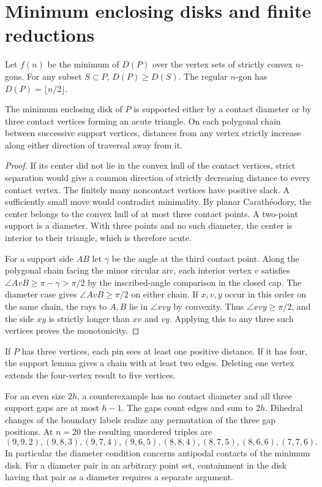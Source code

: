 \section{Minimum enclosing disks and finite reductions}

Let \(f(n)\) be the minimum of \(D(P)\) over the vertex sets of strictly convex \(n\)-gons. For any subset \(S\subset P\), \(D(P)\ge D(S)\). The regular \(n\)-gon has \(D(P)=\lfloor n/2\rfloor\).

\begin{lemma}
The minimum enclosing disk of \(P\) is supported either by a contact diameter or by three contact vertices forming an acute triangle. On each polygonal chain between successive support vertices, distances from any vertex strictly increase along either direction of traversal away from it.
\end{lemma}

\begin{proof}
If its center did not lie in the convex hull of the contact vertices, strict separation would give a common direction of strictly decreasing distance to every contact vertex. The finitely many noncontact vertices have positive slack. A sufficiently small move would contradict minimality. By planar Carath\'eodory, the center belongs to the convex hull of at most three contact points. A two-point support is a diameter. With three points and no such diameter, the center is interior to their triangle, which is therefore acute.

For a support side \(AB\) let \(\gamma\) be the angle at the third contact point. Along the polygonal chain facing the minor circular arc, each interior vertex \(v\) satisfies \(\angle AvB\ge\pi-\gamma>\pi/2\) by the inscribed-angle comparison in the closed cap. The diameter case gives \(\angle AvB\ge\pi/2\) on either chain. If \(x,v,y\) occur in this order on the same chain, the rays to \(A,B\) lie in \(\angle xvy\) by convexity. Thus \(\angle xvy\ge\pi/2\), and the side \(xy\) is strictly longer than \(xv\) and \(vy\). Applying this to any three such vertices proves the monotonicity.
\end{proof}

If \(P\) has three vertices, each pin sees at least one positive distance. If it has four, the support lemma gives a chain with at least two edges. Deleting one vertex extends the four-vertex result to five vertices.

For an even size \(2h\), a counterexample has no contact diameter and all three support gaps are at most \(h-1\). The gaps count edges and sum to \(2h\). Dihedral changes of the boundary labels realize any permutation of the three gap positions. At \(n=20\) the resulting unordered triples are
\[
 (9,9,2), (9,8,3), (9,7,4), (9,6,5), (8,8,4),
 (8,7,5), (8,6,6), (7,7,6).
\]
In particular the diameter condition concerns antipodal contacts of the minimum disk. For a diameter pair in an arbitrary point set, containment in the disk having that pair as a diameter requires a separate argument.

